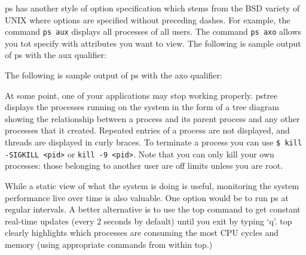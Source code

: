 ps has another style of option specification which stems from the BSD
variety of UNIX where options are specified without preceding dashes.
For example, the command \texttt{ps aux} displays all processes of all
users. The command \texttt{ps axo} allows you tot specify with
attributes you want to view. The following is sample output of ps with
the aux qualifier:

\begin{Shaded}
\end{Shaded}

The following is sample output of ps with the axo qualifier:

\begin{Shaded}
\end{Shaded}

At some point, one of your applications may stop working properly.
pstree displays the processes running on the system in the form of a
tree diagram showing the relationship between a process and its parent
process and any other processes that it created. Repeated entries of a
process are not displayed, and threads are displayed in curly braces. To
terminate a process you can use
\texttt{\$ kill -SIGKILL \textless{}pid\textgreater{}} or
\texttt{kill -9 \textless{}pid\textgreater{}}. Note that you can only
kill your own processes: those belonging to another user are off limits
unless you are root.

While a static view of what the system is doing is useful, monitoring
the system performance live over time is also valuable. One option would
be to run ps at regular intervals. A better alternative is to use the
top command to get constant real-time updates (every 2 seconds by
default) until you exit by typing `q'. top clearly highlights which
processes are consuming the most CPU cycles and memory (using
appropriate commands from within top.)

